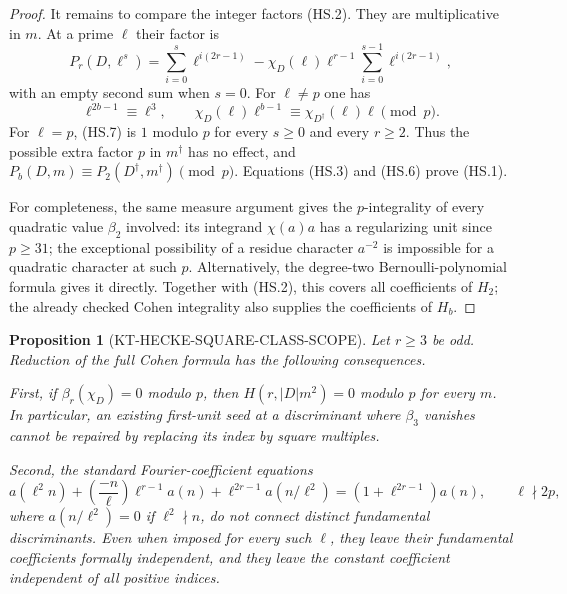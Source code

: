\documentclass[11pt,a4paper]{article}
\newtheorem{proposition}[theorem]{Proposition}
\theoremstyle{definition}
\begin{document}
\begin{proof}
It remains to compare the integer factors (HS.2).
They are multiplicative in $m$.  At a prime $\ell$ their factor is
\[
 P_r(D,\ell^s)=
 \sum_{i=0}^{s}\ell^{i(2r-1)}
   -\chi_D(\ell)\ell^{r-1}
                \sum_{i=0}^{s-1}\ell^{i(2r-1)},       \tag{HS.7}
\]
with an empty second sum when $s=0$.
For $\ell\ne p$ one has
\[
 \ell^{2b-1}\equiv\ell^3,\qquad
 \chi_D(\ell)\ell^{b-1}
      \equiv\chi_{D^\dagger}(\ell)\ell\pmod p.
                                                               \tag{HS.8}
\]
For $\ell=p$, (HS.7) is $1$ modulo $p$ for every $s\geq0$
and every $r\geq2$.  Thus the possible extra factor $p$ in
$m^\dagger$ has no effect, and
$P_b(D,m)\equiv P_2(D^\dagger,m^\dagger)\pmod p$.
Equations (HS.3) and (HS.6) prove (HS.1).

For completeness, the same measure argument gives the
$p$-integrality of every quadratic value $\beta_2$ involved:
its integrand $\chi(a)a$ has a regularizing unit since
$p\geq31$; the exceptional possibility of a residue character
$a^{-2}$ is impossible for a quadratic character at such $p$.
Alternatively, the degree-two Bernoulli-polynomial formula
gives it directly.  Together with (HS.2), this covers all
coefficients of $H_2$; the already checked Cohen integrality
also supplies the coefficients of $H_b$.
\end{proof}

\begin{proposition}[KT-HECKE-SQUARE-CLASS-SCOPE]
Let $r\geq3$ be odd.  Reduction of the full Cohen formula
has the following consequences.

First, if $\beta_r(\chi_D)=0$ modulo $p$, then
$H(r,|D|m^2)=0$ modulo $p$ for every $m$.
In particular, an existing first-unit seed at a discriminant
where $\beta_3$ vanishes cannot be repaired by replacing its
index by square multiples.

Second, the standard Fourier-coefficient equations
\[
 a(\ell^2n)+\left(\frac{-n}{\ell}\right)\ell^{r-1}a(n)
       +\ell^{2r-1}a(n/\ell^2)
       =(1+\ell^{2r-1})a(n),\qquad \ell\nmid2p,         \tag{HS.9}
\]
where $a(n/\ell^2)=0$ if $\ell^2\nmid n$,
do not connect distinct fundamental discriminants.
Even when imposed for every such $\ell$, they leave their
fundamental coefficients formally independent, and they leave
the constant coefficient independent of all positive indices.
\end{proposition}
\end{document}
